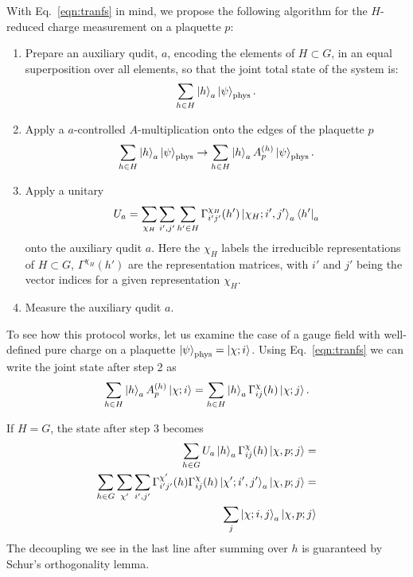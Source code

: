 \documentclass[two column]{article}
\begin{document}
With Eq.~\eqref{eqn:tranfs} in mind, we propose the following algorithm for the $H$-reduced charge measurement on a plaquette $p$:\begin{enumerate}
    \item Prepare an auxiliary qudit, $a$, encoding the elements of $H\subset G$, in an equal superposition over all elements, so that the joint total state of the system is: $$ \sum_{h \in H} \ket{h}_a\ket{\psi}_\text{phys}. $$
    \item Apply a $a$-controlled $A$-multiplication onto the edges of the plaquette $p$$$ \sum_{h \in H} \ket{h}_a\ket{\psi}_\text{phys} \rightarrow \sum_{h \in H} \ket{h}_a A^{(h)}_p \ket{\psi}_\text{phys}. $$
    \item Apply a unitary $$ U_a = \sum_{\chi_H}\sum_{i', j'}\sum_{h'\in H}  \Gamma^{\chi_H}_{i'j'}(h')  \ket{\chi_H; i', j'}_a\bra{h'}_a $$ onto the auxiliary qudit $a$. Here the $\chi_H$ labels the irreducible representations of $H \subset G$, $\Gamma^{\chi_H}(h')$ are the representation matrices, with $i'$ and $j'$ being the vector indices for a given representation $\chi_H$.
    \item Measure the auxiliary qudit $a$.
\end{enumerate}

To see how this protocol works, let us examine the case of a  gauge field with well-defined pure charge on a plaquette  $\ket{\psi}_\text{phys} = \ket{\chi; i}$. Using  Eq.~\eqref{eqn:tranfs} we can write the joint state after step 2 as
\begin{equation}
    \sum_{h \in H} \ket{h}_a A^{(h)}_p \ket{\chi; i} = \sum_{h \in H} \ket{h}_a \Gamma^{\chi}_{ij}(h) \ket{\chi; j}.
\end{equation}

If $H = G$, the state after step 3 becomes\begin{equation}
    \begin{split}
        \sum_{h \in G} U_a\ket{h}_a \Gamma^{\chi}_{ij}(h) \ket{\chi, p; j} = \\
        \sum_{h \in G} \sum_{\chi'}\sum_{i', j'}  \Gamma^{\chi'}_{i'j'}(h)\Gamma^{\chi}_{ij}(h) \ket{\chi'; i', j'}_a \ket{\chi, p; j} =\\
        \sum_j\ket{\chi; i, j}_a \ket{\chi, p; j}
    \end{split}
\end{equation}
The decoupling we see in the last line after summing over $h$ is guaranteed by Schur's orthogonality lemma.
\end{document}
